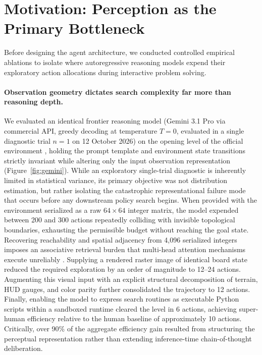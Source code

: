 \section{Motivation: Perception as the Primary Bottleneck}
\label{sec:motivation}

Before designing the agent architecture, we conducted controlled empirical ablations to isolate where autoregressive reasoning models expend their exploratory action allocations during interactive problem solving.

\paragraph{Observation geometry dictates search complexity far more than reasoning depth.}
We evaluated an identical frontier reasoning model (Gemini 3.1 Pro via commercial API, greedy decoding at temperature $T=0$, evaluated in a single diagnostic trial $n=1$ on 12 October 2026) on the opening level of the official environment , holding the prompt template and environment state transitions strictly invariant while altering only the input observation representation (Figure~\ref{fig:gemini}). While an exploratory single-trial diagnostic is inherently limited in statistical variance, its primary objective was not distribution estimation, but rather isolating the catastrophic representational failure mode that occurs before any downstream policy search begins. 
When provided with the environment serialized as a raw $64{\times}64$ integer matrix, the model expended between 200 and 300 actions repeatedly colliding with invisible topological boundaries, exhausting the permissible budget without reaching the goal state. 
Recovering reachability and spatial adjacency from 4,096 serialized integers imposes an associative retrieval burden that multi-head attention mechanisms execute unreliably \citep{rahmanzadehgervi2024blind}. 
Supplying a rendered raster image of identical board state reduced the required exploration by an order of magnitude to 12--24 actions. 
Augmenting this visual input with an explicit structural decomposition of terrain, HUD gauges, and color parity further consolidated the trajectory to 12 actions. 
Finally, enabling the model to express search routines as executable Python scripts within a sandboxed runtime cleared the level in 6 actions, achieving super-human efficiency relative to the human baseline of approximately 10 actions. 
Critically, over 90\% of the aggregate efficiency gain resulted from structuring the perceptual representation rather than extending inference-time chain-of-thought deliberation.

